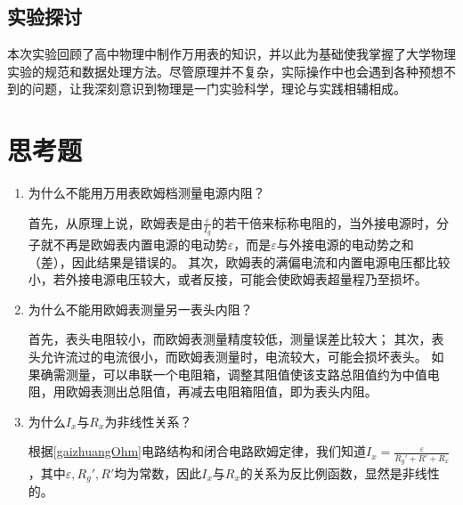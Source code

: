 \documentclass[]{../template/Report}
\begin{document}
\begin{fullreportonly}
\subsection{实验探讨}
本次实验回顾了高中物理中制作万用表的知识，并以此为基础使我掌握了大学物理实验的规范和数据处理方法。尽管原理并不复杂，实际操作中也会遇到各种预想不到的问题，让我深刻意识到物理是一门实验科学，理论与实践相辅相成。

\section{思考题}
\begin{enumerate}
    \item 为什么不能用万用表欧姆档测量电源内阻？

        首先，从原理上说，欧姆表是由$\frac{\varepsilon}{I_g}$的若干倍来标称电阻的，当外接电源时，分子就不再是欧姆表内置电源的电动势$\varepsilon$，而是$\varepsilon$与外接电源的电动势之和（差），因此结果是错误的。
        其次，欧姆表的满偏电流和内置电源电压都比较小，若外接电源电压较大，或者反接，可能会使欧姆表超量程乃至损坏。

    \item 为什么不能用欧姆表测量另一表头内阻？

        首先，表头电阻较小，而欧姆表测量精度较低，测量误差比较大；
        其次，表头允许流过的电流很小，而欧姆表测量时，电流较大，可能会损坏表头。
        如果确需测量，可以串联一个电阻箱，调整其阻值使该支路总阻值约为中值电阻，用欧姆表测出总阻值，再减去电阻箱阻值，即为表头内阻。

    \item 为什么$I_x$与$R_x$为非线性关系？
    
        根据\cref{gaizhuangOhm}电路结构和闭合电路欧姆定律，我们知道$I_x = \frac{\varepsilon}{R_g' + R' + R_x}$，其中$\varepsilon, R_g', R'$均为常数，因此$I_x$与$R_x$的关系为反比例函数，显然是非线性的。   
\end{enumerate}
\end{fullreportonly}
\insertnotes
\end{document}
